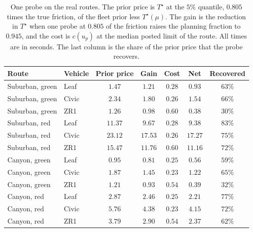 \documentclass[12pt, twoside]{amsart}
\theoremstyle{definition}
\begin{document}
\begin{table}[htbp]
\centering\small
\caption{One probe on the real routes. The prior price is $T^\star$ at the $5\%$ quantile, $0.805$ times the true friction, of the fleet prior less $T^\star(\mu)$. The gain is the reduction in $T^\star$ when one probe at $0.805$ of the friction raises the planning fraction to $0.945$, and the cost is $c(u_p)$ at the median posted limit of the route. All times are in seconds. The last column is the share of the prior price that the probe recovers.}\label{tab:app-routeprobe}
\begin{tabular}{llccccc}
\toprule
Route & Vehicle & Prior price & Gain & Cost & Net & Recovered\\
\midrule
Suburban, green & Leaf & $1.47$ & $1.21$ & $0.28$ & $0.93$ & $63\%$\\
Suburban, green & Civic & $2.34$ & $1.80$ & $0.26$ & $1.54$ & $66\%$\\
Suburban, green & ZR1 & $1.26$ & $0.98$ & $0.60$ & $0.38$ & $30\%$\\
Suburban, red & Leaf & $11.37$ & $9.67$ & $0.28$ & $9.38$ & $83\%$\\
Suburban, red & Civic & $23.12$ & $17.53$ & $0.26$ & $17.27$ & $75\%$\\
Suburban, red & ZR1 & $15.47$ & $11.76$ & $0.60$ & $11.16$ & $72\%$\\
Canyon, green & Leaf & $0.95$ & $0.81$ & $0.25$ & $0.56$ & $59\%$\\
Canyon, green & Civic & $1.87$ & $1.45$ & $0.23$ & $1.22$ & $65\%$\\
Canyon, green & ZR1 & $1.21$ & $0.93$ & $0.54$ & $0.39$ & $32\%$\\
Canyon, red & Leaf & $2.87$ & $2.46$ & $0.25$ & $2.21$ & $77\%$\\
Canyon, red & Civic & $5.76$ & $4.38$ & $0.23$ & $4.15$ & $72\%$\\
Canyon, red & ZR1 & $3.79$ & $2.90$ & $0.54$ & $2.37$ & $62\%$\\
\bottomrule
\end{tabular}
\end{table}
\end{document}
